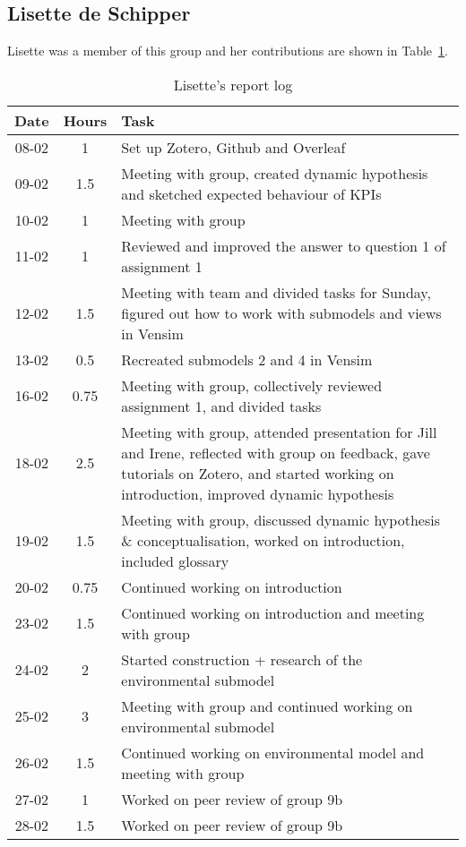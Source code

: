 \subsection{Lisette de Schipper}
Lisette was a member of this group and her contributions are shown in Table~\ref{tab:lisette_log}. 
\begin{longtable}[c]{c|c|m{35em}}
\caption{Lisette's report log}
\label{tab:lisette_log}\\
\textbf{Date}& \textbf{Hours} & \textbf{Task} \\
\hline
\endfirsthead
%
\endhead
%
08-02 & 1 & Set up Zotero, Github and Overleaf \\
09-02 & 1.5 & Meeting with group, created dynamic hypothesis and sketched expected behaviour of KPIs\\
10-02 & 1 & Meeting with group \\
11-02 & 1 & Reviewed and improved the answer to question 1 of assignment 1 \\
12-02 & 1.5 & Meeting with team and divided tasks for Sunday, figured out how to work with submodels and views in Vensim \\
13-02 & 0.5 & Recreated submodels 2 and 4 in Vensim \\
16-02 & 0.75 & Meeting with group, collectively reviewed assignment 1, and divided tasks \\
18-02 & 2.5 & Meeting with group, attended presentation for Jill and Irene, reflected with group on feedback, gave tutorials on Zotero, and started working on introduction, improved dynamic hypothesis \\
19-02 & 1.5 & Meeting with group, discussed dynamic hypothesis \& conceptualisation, worked on introduction, included glossary \\
20-02 & 0.75 & Continued working on introduction \\
23-02 & 1.5 & Continued working on introduction and meeting with group \\
24-02 & 2 & Started construction + research of the environmental submodel \\
25-02 & 3 & Meeting with group and continued working on environmental submodel \\
26-02 & 1.5 & Continued working on environmental model and meeting with group \\
27-02 & 1 & Worked on peer review of group 9b \\
28-02 & 1.5 & Worked on peer review of group 9b \\

\end{longtable}
